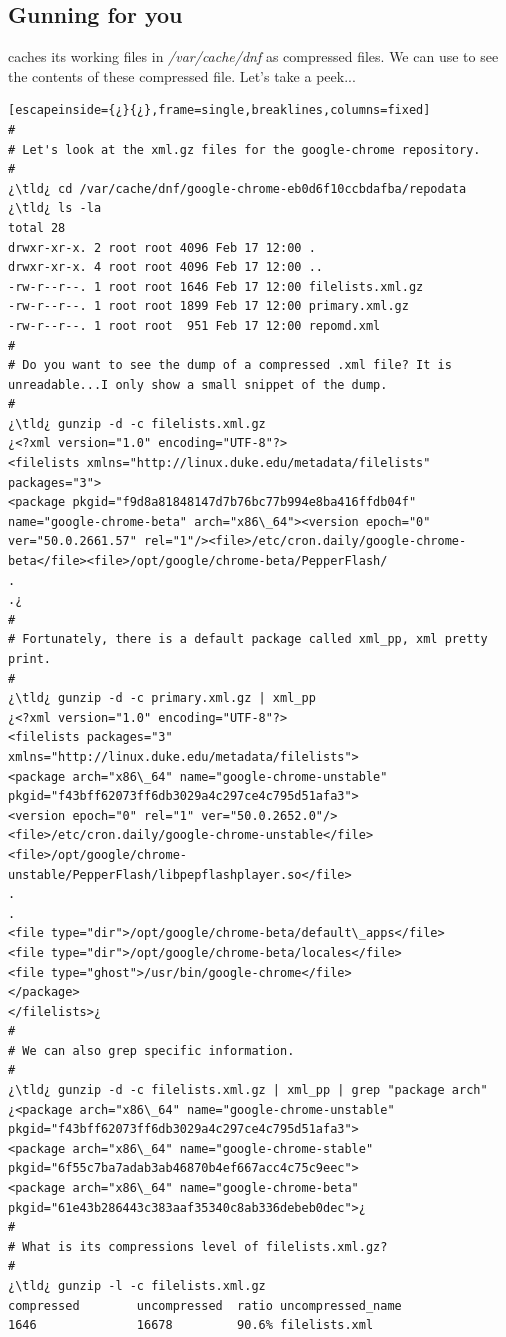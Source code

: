 \subsection{Gunning for you}

 caches its working files in \textsl{/var/cache/dnf} as compressed files. We can use  to see the contents of these compressed file.  Let's take a peek...


\begin{lstlisting}[escapeinside={¿}{¿},frame=single,breaklines,columns=fixed]
#
# Let's look at the xml.gz files for the google-chrome repository.
#
¿\tld¿ cd /var/cache/dnf/google-chrome-eb0d6f10ccbdafba/repodata
¿\tld¿ ls -la
total 28
drwxr-xr-x. 2 root root 4096 Feb 17 12:00 .
drwxr-xr-x. 4 root root 4096 Feb 17 12:00 ..
-rw-r--r--. 1 root root 1646 Feb 17 12:00 filelists.xml.gz
-rw-r--r--. 1 root root 1899 Feb 17 12:00 primary.xml.gz
-rw-r--r--. 1 root root  951 Feb 17 12:00 repomd.xml
#
# Do you want to see the dump of a compressed .xml file? It is unreadable...I only show a small snippet of the dump.
#
¿\tld¿ gunzip -d -c filelists.xml.gz
¿<?xml version="1.0" encoding="UTF-8"?>
<filelists xmlns="http://linux.duke.edu/metadata/filelists" packages="3">
<package pkgid="f9d8a81848147d7b76bc77b994e8ba416ffdb04f" name="google-chrome-beta" arch="x86\_64"><version epoch="0" ver="50.0.2661.57" rel="1"/><file>/etc/cron.daily/google-chrome-beta</file><file>/opt/google/chrome-beta/PepperFlash/
.
.¿
#
# Fortunately, there is a default package called xml_pp, xml pretty print.
#
¿\tld¿ gunzip -d -c primary.xml.gz | xml_pp
¿<?xml version="1.0" encoding="UTF-8"?>
<filelists packages="3" xmlns="http://linux.duke.edu/metadata/filelists">
<package arch="x86\_64" name="google-chrome-unstable" pkgid="f43bff62073ff6db3029a4c297ce4c795d51afa3">
<version epoch="0" rel="1" ver="50.0.2652.0"/>
<file>/etc/cron.daily/google-chrome-unstable</file>
<file>/opt/google/chrome-unstable/PepperFlash/libpepflashplayer.so</file>
.
.
<file type="dir">/opt/google/chrome-beta/default\_apps</file>
<file type="dir">/opt/google/chrome-beta/locales</file>
<file type="ghost">/usr/bin/google-chrome</file>
</package>
</filelists>¿
#
# We can also grep specific information.
#
¿\tld¿ gunzip -d -c filelists.xml.gz | xml_pp | grep "package arch"
¿<package arch="x86\_64" name="google-chrome-unstable" pkgid="f43bff62073ff6db3029a4c297ce4c795d51afa3">
<package arch="x86\_64" name="google-chrome-stable" pkgid="6f55c7ba7adab3ab46870b4ef667acc4c75c9eec">
<package arch="x86\_64" name="google-chrome-beta" pkgid="61e43b286443c383aaf35340c8ab336debeb0dec">¿
#
# What is its compressions level of filelists.xml.gz?
#
¿\tld¿ gunzip -l -c filelists.xml.gz
compressed        uncompressed  ratio uncompressed_name
1646              16678         90.6% filelists.xml
\end{lstlisting}


